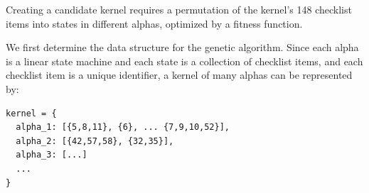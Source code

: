 \documentclass[3p,times,procedia]{elsarticle}
\begin{document}
Creating a candidate kernel requires a permutation of the kernel's 148 checklist items into states in different alphas, optimized by a fitness function.







We first determine the data structure for the genetic algorithm. Since each alpha is a linear state machine and each state is a collection of checklist items, and each checklist item is a unique identifier, a kernel of many alphas can be represented by:

\begin{verbatim}
kernel = {
  alpha_1: [{5,8,11}, {6}, ... {7,9,10,52}],
  alpha_2: [{42,57,58}, {32,35}],
  alpha_3: [...]
  ...
}
\end{verbatim}
\end{document}
